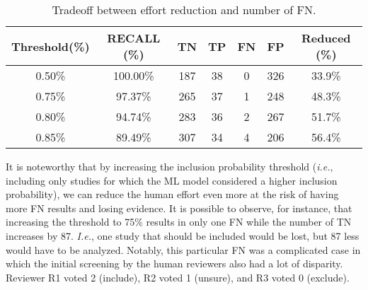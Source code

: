 \begin{table}[ht]
\centering
\scriptsize
\caption{Tradeoff between effort reduction and number of FN.}
\label{tab:effort_reduction}
\begin{tabular}{|c|c|c|c|c|c|c|}
\hline
\textbf{Threshold(\%)} & \textbf{RECALL (\%)} & \textbf{TN} & \textbf{TP} & \textbf{FN} & \textbf{FP} & \textbf{Reduced (\%)} \\
\hline
0.50\% & 100.00\% & 187 & 38 & 0 & 326 & 33.9\% \\ 
0.75\% & 97.37\% & 265 & 37 & 1 & 248 & 48.3\% \\  
0.80\% & 94.74\% & 283 & 36 & 2 & 267 & 51.7\% \\  
0.85\% & 89.49\% & 307 & 34 & 4 & 206 & 56.4\% \\ 
\hline
\end{tabular}
\end{table}


It is noteworthy that by increasing the inclusion probability threshold (\textit{i.e.}, including only studies for which the ML model considered a higher inclusion probability), we can reduce the human effort even more at the risk of having more FN results and losing evidence. It is possible to observe, for instance, that increasing the threshold to 75\% results in only one FN while the number of TN increases by 87. \textit{I.e.}, one study that should be included would be lost, but 87 less would have to be analyzed. Notably, this particular FN was a complicated case in which the initial screening by the human reviewers also had a lot of disparity. Reviewer R1 voted 2 (include), R2 voted 1 (unsure), and R3 voted 0 (exclude). 






